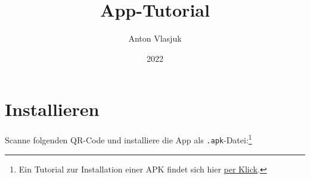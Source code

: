 \documentclass[ngerman]{tutorial}
\title{App-Tutorial}
\author{Anton Vlasjuk}
\date{2022}
\begin{document}
\maketitle
\tableofcontents
\bigskip\vfill

\section{Installieren}
Scanne folgenden QR-Code und installiere die App als \texttt{.apk}-Datei:\footnote{Ein Tutorial zur Installation einer APK findet sich hier \href{https://www.heise.de/tipps-tricks/Externe-Apps-APK-Dateien-bei-Android-installieren-so-klappt-s-3714330.html}{per Klick}.}
\vfill
\begin{center}
\end{center}
\vfill
\newpage
\end{document}
